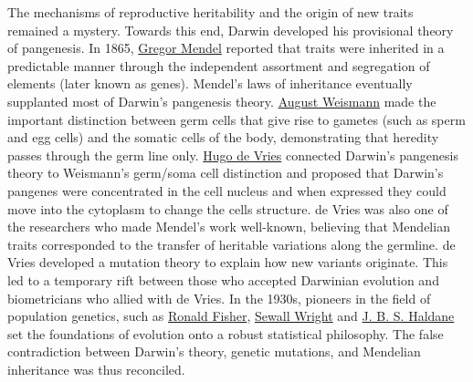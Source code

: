 The mechanisms of reproductive heritability and the origin of new traits remained a mystery. Towards this end, Darwin developed his provisional theory of pangenesis. In 1865, \href{https://en.wikipedia.org/wiki/Gregor_Mendel}{Gregor Mendel} reported that traits were inherited in a predictable manner through the independent assortment and segregation of elements (later known as genes). Mendel's laws of inheritance eventually supplanted most of Darwin's pangenesis theory. \href{https://en.wikipedia.org/wiki/August_Weismann}{August Weismann} made the important distinction between germ cells that give rise to gametes (such as sperm and egg cells) and the somatic cells of the body, demonstrating that heredity passes through the germ line only. \href{https://en.wikipedia.org/wiki/Hugo_de_Vries}{Hugo de Vries} connected Darwin's pangenesis theory to Weismann's germ/soma cell distinction and proposed that Darwin's pangenes were concentrated in the cell nucleus and when expressed they could move into the cytoplasm to change the cells structure. de Vries was also one of the researchers who made Mendel's work well-known, believing that Mendelian traits corresponded to the transfer of heritable variations along the germline. de Vries developed a mutation theory to explain how new variants originate. This led to a temporary rift between those who accepted Darwinian evolution and biometricians who allied with de Vries. In the 1930s, pioneers in the field of population genetics, such as \href{https://en.wikipedia.org/wiki/Ronald_Fisher}{Ronald Fisher}, \href{https://en.wikipedia.org/wiki/Sewall_Wright}{Sewall Wright} and \href{https://en.wikipedia.org/wiki/J._B._S._Haldane}{J. B. S. Haldane} set the foundations of evolution onto a robust statistical philosophy. The false contradiction between Darwin's theory, genetic mutations, and Mendelian inheritance was thus reconciled.

